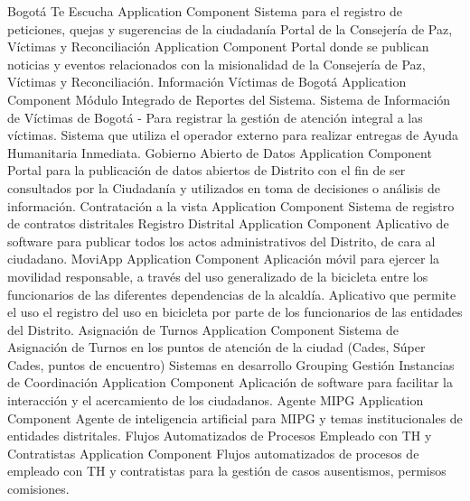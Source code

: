 \documentclass[
	a4paper, %
	12pt, %
]{include/CSSullivanBusinessReport}
\begin{document}
\textbar{} \textbar{} Bogotá Te Escucha \textbar{} Application Component
\textbar{} Sistema para el registro de peticiones, quejas y sugerencias
de la ciudadanía \textbar{} \textbar{} Portal de la Consejería de Paz,
Víctimas y Reconciliación \textbar{} Application Component \textbar{}
Portal donde se publican noticias y eventos relacionados con la
misionalidad de la Consejería de Paz, Víctimas y Reconciliación.
\textbar{} \textbar{} Información Víctimas de Bogotá \textbar{}
Application Component \textbar{} Módulo Integrado de Reportes del
Sistema. Sistema de Información de Víctimas de Bogotá - Para registrar
la gestión de atención integral a las víctimas. Sistema que utiliza el
operador externo para realizar entregas de Ayuda Humanitaria Inmediata.
\textbar{} \textbar{} Gobierno Abierto de Datos \textbar{} Application
Component \textbar{} Portal para la publicación de datos abiertos de
Distrito con el fin de ser consultados por la Ciudadanía y utilizados en
toma de decisiones o análisis de información. \textbar{} \textbar{}
Contratación a la vista \textbar{} Application Component \textbar{}
Sistema de registro de contratos distritales \textbar{} \textbar{}
Registro Distrital \textbar{} Application Component \textbar{}
Aplicativo de software para publicar todos los actos administrativos del
Distrito, de cara al ciudadano. \textbar{} \textbar{} MoviApp \textbar{}
Application Component \textbar{} Aplicación móvil para ejercer la
movilidad responsable, a través del uso generalizado de la bicicleta
entre los funcionarios de las diferentes dependencias de la alcaldía.
Aplicativo que permite el uso el registro del uso en bicicleta por parte
de los funcionarios de las entidades del Distrito. \textbar{} \textbar{}
Asignación de Turnos \textbar{} Application Component \textbar{} Sistema
de Asignación de Turnos en los puntos de atención de la ciudad (Cades,
Súper Cades, puntos de encuentro) \textbar{} \textbar{} Sistemas en
desarrollo \textbar{} Grouping \textbar{} \textbar{} \textbar{} Gestión
Instancias de Coordinación \textbar{} Application Component \textbar{}
Aplicación de software para facilitar la interacción y el acercamiento
de los ciudadanos. \textbar{} \textbar{} Agente MIPG \textbar{}
Application Component \textbar{} Agente de inteligencia artificial para
MIPG y temas institucionales de entidades distritales. \textbar{}
\textbar{} Flujos Automatizados de Procesos Empleado con TH y
Contratistas \textbar{} Application Component \textbar{} Flujos
automatizados de procesos de empleado con TH y contratistas para la
gestión de casos ausentismos, permisos comisiones. \textbar{} \textbar{}
\end{document}

